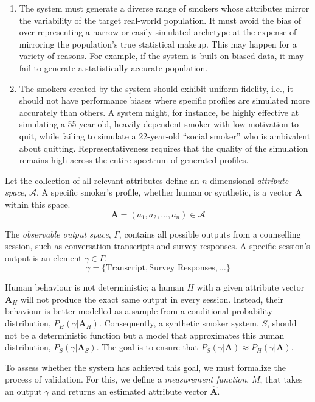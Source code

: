 \begin{enumerate}
    \item The system must generate a diverse range of smokers whose attributes mirror the variability of the target real-world population. It must avoid the bias of over-representing a narrow or easily simulated archetype at the expense of mirroring the population's true statistical makeup. This may happen for a variety of reasons. For example, if the system is built on biased data, it may fail to generate a statistically accurate population.

    \item The smokers created by the system should exhibit uniform fidelity, i.e., it should not have performance biases where specific profiles are simulated more accurately than others. A system might, for instance, be highly effective at simulating a 55-year-old, heavily dependent smoker with low motivation to quit, while failing to simulate a 22-year-old ``social smoker'' who is ambivalent about quitting. Representativeness requires that the quality of the simulation remains high across the entire spectrum of generated profiles.
\end{enumerate}



Let the collection of all relevant attributes define an $n$-dimensional \emph{attribute space}, $\mathcal{A}$. A specific smoker's profile, whether human or synthetic, is a vector $\textbf{A}$ within this space.
$$\textbf{A} = (a_1, a_2, \ldots, a_n) \in \mathcal{A}$$

The \emph{observable output space}, $\Gamma$, contains all possible outputs from a counselling session, such as conversation transcripts and survey responses. A specific session's output is an element $\gamma \in \Gamma$.
$$\gamma = \{\text{Transcript}, \text{Survey Responses}, \ldots\}$$

Human behaviour is not deterministic; a human $H$ with a given attribute vector $\textbf{A}_H$ will not produce the exact same output in every session. Instead, their behaviour is better modelled as a sample from a conditional probability distribution, $P_H(\gamma | \textbf{A}_H)$. Consequently, a synthetic smoker system, $S$, should not be a deterministic function but a model that approximates this human distribution, $P_S(\gamma | \textbf{A}_S)$. The goal is to ensure that $P_S(\gamma | \textbf{A}) \approx P_H(\gamma | \textbf{A})$.

To assess whether the system has achieved this goal, we must formalize the process of validation. For this, we define a \emph{measurement function}, $M$, that takes an output $\gamma$ and returns an estimated attribute vector $\hat{\textbf{A}}$.

